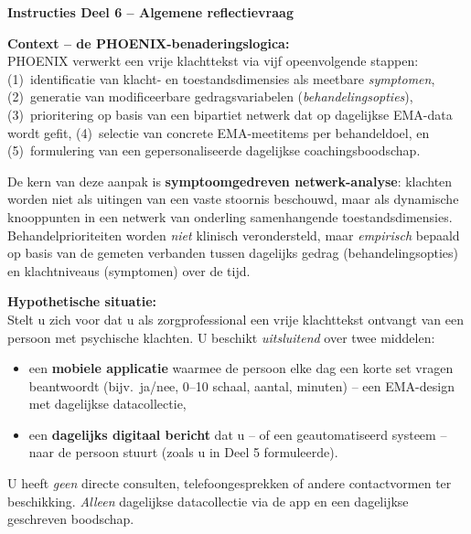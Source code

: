 \documentclass[11pt,a4paper]{article}
\begin{document}
\begin{tcolorbox}[colback=AccentOrange,colframe=GoldAmber,arc=2.5mm,boxrule=0.9pt,
  left=10pt,right=10pt,top=9pt,bottom=9pt]
\textbf{\color{GoldAmber}Instructies Deel 6 -- Algemene reflectievraag}

\smallskip\small
\textbf{Context -- de PHOENIX-benaderingslogica:}\\[0.3em]
PHOENIX verwerkt een vrije klachttekst via vijf opeenvolgende stappen:
(1)~identificatie van klacht- en toestandsdimensies als meetbare \emph{symptomen},
(2)~generatie van modificeerbare gedragsvariabelen (\emph{behandelingsopties}),
(3)~prioritering op basis van een bipartiet netwerk dat op dagelijkse EMA-data wordt gefit,
(4)~selectie van concrete EMA-meetitems per behandeldoel, en
(5)~formulering van een gepersonaliseerde dagelijkse coachingsboodschap.

De kern van deze aanpak is \textbf{symptoomgedreven netwerk-analyse}: klachten worden niet als
uitingen van een vaste stoornis beschouwd, maar als dynamische knooppunten in een netwerk van
onderling samenhangende toestandsdimensies. Behandelprioriteiten worden \emph{niet}
klinisch verondersteld, maar \emph{empirisch} bepaald op basis van de gemeten verbanden
tussen dagelijks gedrag (behandelingsopties) en klachtniveaus (symptomen) over de tijd.

\medskip
\textbf{Hypothetische situatie:}\\[0.3em]
Stelt u zich voor dat u als zorgprofessional een vrije klachttekst ontvangt van een persoon
met psychische klachten. U beschikt \emph{uitsluitend} over twee middelen:
\begin{itemize}[topsep=2pt,itemsep=1pt]
\item een \textbf{mobiele applicatie} waarmee de persoon elke dag een korte set vragen
beantwoordt (bijv.\ ja/nee, 0--10 schaal, aantal, minuten) -- een EMA-design met
dagelijkse datacollectie,
\item een \textbf{dagelijks digitaal bericht} dat u -- of een geautomatiseerd systeem --
naar de persoon stuurt (zoals u in Deel 5 formuleerde).
\end{itemize}
U heeft \emph{geen} directe consulten, telefoongesprekken of andere contactvormen ter beschikking.
\emph{Alleen} dagelijkse datacollectie via de app en een dagelijkse geschreven boodschap.


\end{tcolorbox}
\end{document}

